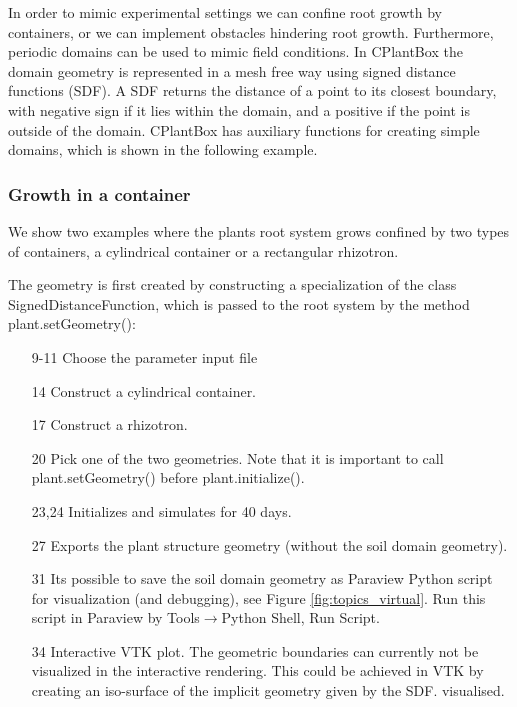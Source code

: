 In order to mimic experimental settings we can confine root growth by containers, or we can implement obstacles hindering root growth. Furthermore, periodic domains can be used to mimic field conditions. In CPlantBox the domain geometry is represented in a mesh free way using signed distance functions (SDF). A SDF returns the distance of a point to its closest boundary, with negative sign if it lies within the domain, and a positive if the point is outside of the domain. CPlantBox has auxiliary functions for creating simple domains, which is shown in the following example.

\subsubsection*{Growth in a container}

We show two examples where the plants root system grows confined by two types of containers, a cylindrical container or a rectangular rhizotron. 



The geometry is first created by constructing a specialization of the class {SignedDistanceFunction}, 
which is passed to the root system by the method {plant.setGeometry()}: 
\begin{itemize}
 \item[9-11] Choose the parameter input file
 \item[14] Construct a cylindrical container. 
 \item[17] Construct a rhizotron.
 \item[20] Pick one of the two geometries. Note that it is important to call plant.setGeometry() before plant.initialize().
 \item[23,24] Initializes and simulates for 40 days.
 \item[27] Exports the plant structure geometry (without the soil domain geometry).
 \item[31] Its possible to save the soil domain geometry as Paraview Python script for visualization (and debugging), see Figure \ref{fig:topics_virtual}. Run this script in Paraview by Tools$\rightarrow$Python Shell, Run Script. 
\item[34] Interactive VTK plot. The geometric boundaries can currently not be visualized in the interactive rendering. This could be achieved in VTK by creating an iso-surface of the implicit geometry given by the SDF. visualised. 
\end{itemize}

